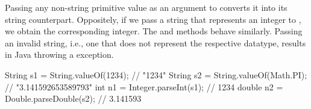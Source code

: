 Passing any non-string primitive value as an argument to  converts it into its string counterpart.
Oppositely, if we pass a string that represents an integer to , we obtain the corresponding integer. 
The  and  methods behave similarly. 
Passing an invalid string, i.e., one that does not represent the respective datatype, results in Java throwing a  exception.

\begin{verbnobox}[\small]
String s1 = String.valueOf(1234);    // "1234"
String s2 = String.valueOf(Math.PI); // "3.141592653589793"
int n1 = Integer.parseInt(s1);       // 1234
double n2 = Double.parseDouble(s2);  // 3.141593
\end{verbnobox}





